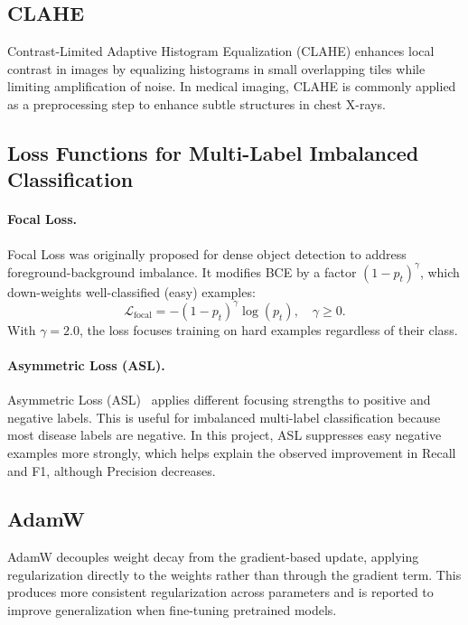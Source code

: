 \subsection{CLAHE}

Contrast-Limited Adaptive Histogram Equalization (CLAHE) enhances local contrast in images by equalizing histograms in small overlapping tiles while limiting amplification of noise.
In medical imaging, CLAHE is commonly applied as a preprocessing step to enhance subtle structures in chest X-rays.

\subsection{Loss Functions for Multi-Label Imbalanced Classification}

\paragraph{Focal Loss.}
Focal Loss was originally proposed for dense object detection to address foreground-background imbalance.
It modifies BCE by a factor $(1 - p_t)^\gamma$, which down-weights well-classified (easy) examples:
\[
  \mathcal{L}_\text{focal} = -(1-p_t)^\gamma \log(p_t), \quad \gamma \geq 0.
\]
With $\gamma{=}2.0$, the loss focuses training on hard examples regardless of their class.

\paragraph{Asymmetric Loss (ASL).}
Asymmetric Loss (ASL)~\cite{ridnik2021asl} applies different focusing strengths to positive and negative labels.
This is useful for imbalanced multi-label classification because most disease labels are negative.
In this project, ASL suppresses easy negative examples more strongly, which helps explain the observed improvement in Recall and F1, although Precision decreases.

\subsection{AdamW}

AdamW decouples weight decay from the gradient-based update, applying regularization directly to the weights rather than through the gradient term.
This produces more consistent regularization across parameters and is reported to improve generalization when fine-tuning pretrained models.
